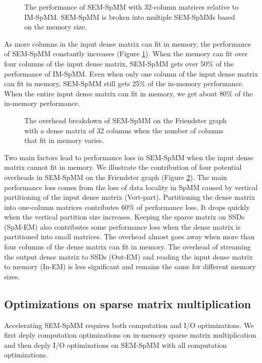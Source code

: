 \begin{figure}
	\begin{center}
		\footnotesize
		
		\caption{The performance of SEM-SpMM with 32-column matrices
			relative to IM-SpMM. SEM-SpMM is broken into multiple SEM-SpMMs
		based on the memory size.}
		\label{perf:spmm32}
	\end{center}
\end{figure}

As more columns in the input dense matrix can fit in memory, the performance
of SEM-SpMM constantly increases (Figure \ref{perf:spmm32}). When the memory
can fit over four columns of the input dense matrix, SEM-SpMM gets over 50\%
of the performance of IM-SpMM. Even when only one column of the input dense
matrix can fit in memory, SEM-SpMM still gets 25\% of the in-memory performance.
When the entire input dense matrix can fit in memory, we get about 80\% of
the in-memory performance.

\begin{figure}
	\begin{center}
		\footnotesize
		
		\caption{The overhead breakdown of SEM-SpMM on the Friendster
			graph with a dense matrix of 32 columns when the number
			of columns that fit in memory varies. }
		\label{perf:spmm32_over}
	\end{center}
\end{figure}

Two main factors lead to performance loss in SEM-SpMM when the input dense matrix
cannot fit in memory. We illustrate the contribution of four potential overheads
in SEM-SpMM on the Friendster graph (Figure \ref{perf:spmm32_over}). The main
performance loss comes from the loss of data locality in SpMM caused by
vertical partitioning of the input dense matrix (Vert-part). Partitioning
the dense matrix into one-column matrices contributes 60\% of performance loss.
It drops quickly when the vertical
partition size increases. Keeping the sparse matrix on SSDs (SpM-EM)
also contributes some performance loss when the dense matrix is partitioned
into small matrices. The overhead almost goes away when more than four columns
of the dense matrix can fit in memory. The overhead of streaming the output dense
matrix to SSDs (Out-EM) and reading the input dense matrix to memory (In-EM)
is less significant and remains the same for different memory sizes.

\subsection{Optimizations on sparse matrix multiplication}
Accelerating SEM-SpMM requires both computation and I/O optimizations.
We first deply computation optimizations
on in-memory sparse matrix multiplication and then
deply I/O optimizations on SEM-SpMM with all computation optimizations.

